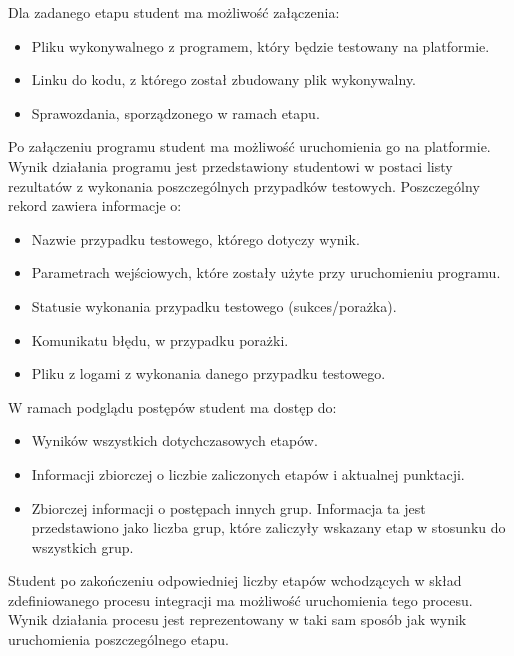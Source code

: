 Dla zadanego etapu student ma możliwość załączenia:
\begin {itemize}
    \item Pliku wykonywalnego z programem, który będzie testowany na platformie.
    \item Linku do kodu, z którego został zbudowany plik wykonywalny.
    \item Sprawozdania, sporządzonego w ramach etapu.
\end {itemize}

Po załączeniu programu student ma możliwość uruchomienia go na platformie.
Wynik działania programu jest przedstawiony studentowi w postaci listy rezultatów z wykonania poszczególnych przypadków testowych.
Poszczególny rekord zawiera informacje o:
\begin {itemize}
    \item Nazwie przypadku testowego, którego dotyczy wynik.
    \item Parametrach wejściowych, które zostały użyte przy uruchomieniu programu.
    \item Statusie wykonania przypadku testowego (sukces/porażka).
    \item Komunikatu błędu, w przypadku porażki.
    \item Pliku z logami z wykonania danego przypadku testowego.
\end{itemize}

W ramach podglądu postępów student ma dostęp do:
\begin {itemize}
    \item Wyników wszystkich dotychczasowych etapów.
    \item Informacji zbiorczej o liczbie zaliczonych etapów i aktualnej punktacji.
    \item Zbiorczej informacji o postępach innych grup.
    Informacja ta jest przedstawiono jako liczba grup, które zaliczyły wskazany etap w stosunku do wszystkich grup.
\end {itemize}

Student po zakończeniu odpowiedniej liczby etapów wchodzących w skład zdefiniowanego procesu integracji ma możliwość uruchomienia tego procesu.
Wynik działania procesu jest reprezentowany w taki sam sposób jak wynik uruchomienia poszczególnego etapu.